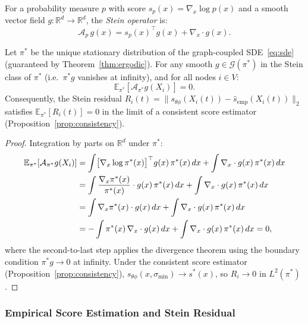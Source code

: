 For a probability measure $p$ with score $s_p(x) = \nabla_x \log p(x)$ and
a smooth vector field $g : \mathbb{R}^d \to \mathbb{R}^d$, the
\emph{Stein operator} is:
\begin{equation}\label{eq:stein_op}
\mathcal{A}_p\, g(x)
= s_p(x)^\top g(x) + \nabla_x \cdot g(x).
\end{equation}
\begin{theorem}
\label{thm:stein}
Let $\pi^*$ be the unique stationary distribution of the graph-coupled
SDE~\eqref{eq:sde} (guaranteed by Theorem~\ref{thm:ergodic}).
For any smooth $g \in \mathcal{G}(\pi^*)$ in the Stein class of $\pi^*$
(i.e.\ $\pi^* g$ vanishes at infinity), and for all nodes $i \in V$:
\begin{equation}\label{eq:stein_id}
\mathbb{E}_{\pi^*}\!\left[\mathcal{A}_{\pi^*} g(X_i)\right] = 0.
\end{equation}
Consequently, the Stein residual $R_i(t) = \|s_{\theta\phi}(X_i(t))
- \hat{s}_{\mathrm{emp}}(X_i(t))\|_2$ satisfies
$\mathbb{E}_{\pi^*}[R_i(t)] = 0$ in the limit of a consistent score
estimator (Proposition~\ref{prop:consistency}).
\end{theorem}

\begin{proof}
Integration by parts on $\mathbb{R}^d$ under $\pi^*$:
\begin{align}
\mathbb{E}_{\pi^*}[\mathcal{A}_{\pi^*} g(X_i)]
&= \int \bigl[\nabla_x \log\pi^*(x)\bigr]^\top g(x)\,\pi^*(x)\,dx
   + \int \nabla_x \cdot g(x)\,\pi^*(x)\,dx \notag\\
&= \int \frac{\nabla_x \pi^*(x)}{\pi^*(x)}\cdot g(x)\,\pi^*(x)\,dx
   + \int \nabla_x \cdot g(x)\,\pi^*(x)\,dx \notag\\
&= \int \nabla_x \pi^*(x)\cdot g(x)\,dx
   + \int \nabla_x \cdot g(x)\,\pi^*(x)\,dx \notag\\
&= -\int \pi^*(x)\,\nabla_x \cdot g(x)\,dx
   + \int \nabla_x \cdot g(x)\,\pi^*(x)\,dx = 0,
\label{eq:stein_proof}
\end{align}
where the second-to-last step applies the divergence theorem using the
boundary condition $\pi^* g \to 0$ at infinity.
Under the consistent score estimator (Proposition~\ref{prop:consistency}),
$s_{\theta\phi}(x, \sigma_{\min}) \to s^*(x)$, so $R_i \to 0$ in $L^2(\pi^*)$.
\end{proof}

\subsubsection{Empirical Score Estimation and Stein Residual}

